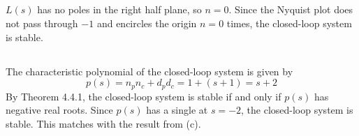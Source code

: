 \subsection{}
$L(s)$ has no poles in the right half plane, so $n = 0$. Since the Nyquist plot does not pass through $-1$ and encircles
the origin $n=0$ times, the closed-loop system is stable.

\subsection{}
The characteristic polynomial of the closed-loop system is given by
\begin{equation*}
    p(s) = n_p n_c + d_p d_c = 1 + (s+1) = s + 2
\end{equation*}
By Theorem 4.4.1, the closed-loop system is stable if and only if $p(s)$ has negative real roots. Since $p(s)$ has a single
at $s = -2$, the closed-loop system is stable. This matches with the result from (c).